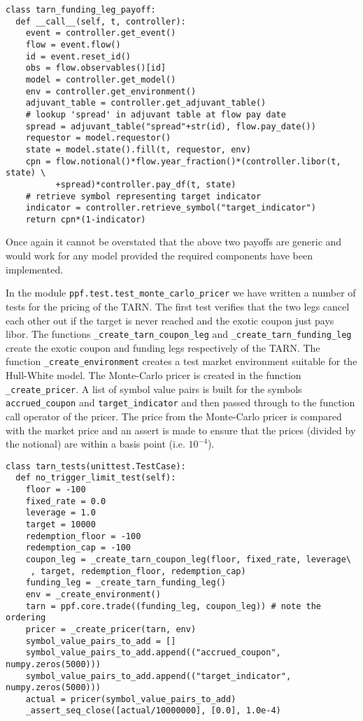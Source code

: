 \begin{verbatim}
class tarn_funding_leg_payoff:
  def __call__(self, t, controller):
    event = controller.get_event() 
    flow = event.flow()
    id = event.reset_id()
    obs = flow.observables()[id]
    model = controller.get_model()
    env = controller.get_environment()
    adjuvant_table = controller.get_adjuvant_table()
    # lookup 'spread' in adjuvant table at flow pay date
    spread = adjuvant_table("spread"+str(id), flow.pay_date())
    requestor = model.requestor()
    state = model.state().fill(t, requestor, env)
    cpn = flow.notional()*flow.year_fraction()*(controller.libor(t, state) \
          +spread)*controller.pay_df(t, state)
    # retrieve symbol representing target indicator 
    indicator = controller.retrieve_symbol("target_indicator")
    return cpn*(1-indicator)
\end{verbatim}

Once again it cannot be overstated that the above two payoffs are generic and would work for any model provided the required components have been implemented.

In the module \verb|ppf.test.test_monte_carlo_pricer| we have written a number of tests for the pricing of the TARN. The first test verifies that the two legs cancel each other out if the target is never reached and the exotic coupon just pays libor. The functions \verb|_create_tarn_coupon_leg| and \verb|_create_tarn_funding_leg| create the exotic coupon and funding legs respectively of the TARN. The function \verb|_create_environment| creates a test market environment suitable for the Hull-White model. The Monte-Carlo pricer is created in the function \verb|_create_pricer|. A list of symbol value pairs is built for the symbols \verb|accrued_coupon| and \verb|target_indicator| and then passed through to the function call operator of the pricer. The price from the Monte-Carlo pricer is compared with the market price and an assert is made to ensure that the prices (divided by the notional) are within a basis point (i.e. $10^{-4}$).

\begin{verbatim}
class tarn_tests(unittest.TestCase):
  def no_trigger_limit_test(self):
    floor = -100
    fixed_rate = 0.0
    leverage = 1.0
    target = 10000
    redemption_floor = -100
    redemption_cap = -100
    coupon_leg = _create_tarn_coupon_leg(floor, fixed_rate, leverage\
     , target, redemption_floor, redemption_cap)
    funding_leg = _create_tarn_funding_leg()
    env = _create_environment()
    tarn = ppf.core.trade((funding_leg, coupon_leg)) # note the ordering
    pricer = _create_pricer(tarn, env)
    symbol_value_pairs_to_add = []
    symbol_value_pairs_to_add.append(("accrued_coupon", numpy.zeros(5000)))
    symbol_value_pairs_to_add.append(("target_indicator", numpy.zeros(5000)))
    actual = pricer(symbol_value_pairs_to_add)
    _assert_seq_close([actual/10000000], [0.0], 1.0e-4)
\end{verbatim}

